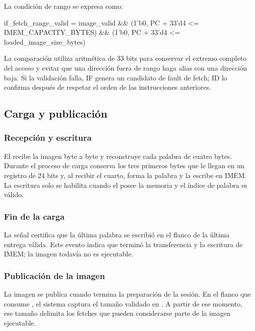 La condición de rango se expresa como:

\begin{codebox}
if_fetch_range_valid =
    image_valid
    && ({1'b0, PC} + 33'd4 <= IMEM_CAPACITY_BYTES)
    && ({1'b0, PC} + 33'd4 <= loaded_image_size_bytes)
\end{codebox}

La comparación utiliza aritmética de 33 bits para conservar el extremo completo
del acceso y evitar que una dirección fuera de rango haga alias con una dirección
baja. Si la validación falla, IF genera un candidato de fault de fetch; ID lo
confirma después de respetar el orden de las instrucciones anteriores.

\subsection{Carga y publicación}

\subsubsection{Recepción y escritura}

El  recibe la imagen byte a byte y reconstruye cada palabra de
cuatro bytes. Durante el proceso de carga conserva los tres primeros bytes que le llegan en un registro de 24 bits y, al
recibir el cuarto, forma la palabra y la escribe en IMEM. La escritura solo se
habilita cuando el  posee la memoria y el índice de palabra es
válido.

\subsubsection{Fin de la carga}

La señal  certifica que la última palabra se escribió en el
flanco de la última entrega válida. Este evento indica que terminó la
transferencia y la escritura de IMEM; la imagen todavía no es ejecutable.

\subsubsection{Publicación de la imagen}

La imagen se publica cuando termina la preparación de la sesión. En el flanco
que consume , el sistema captura el tamaño validado en
. A partir de ese momento, ese tamaño delimita
los fetches que pueden considerarse parte de la imagen ejecutable.

